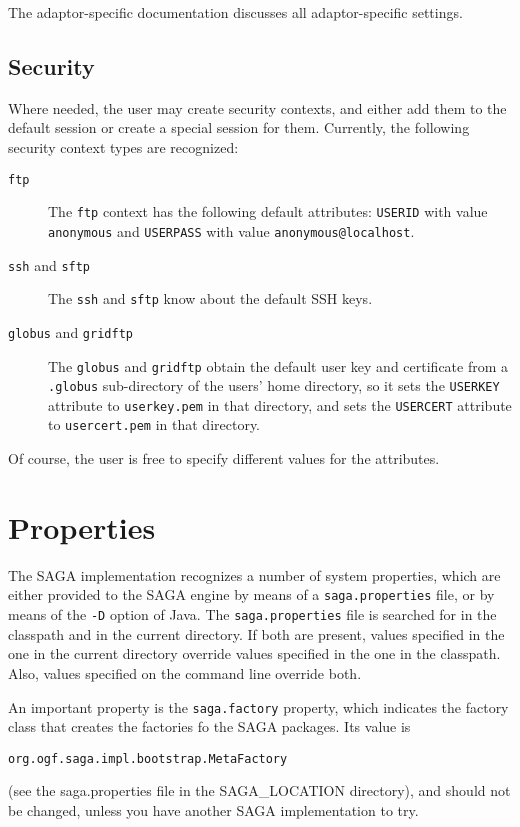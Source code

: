 \documentclass[a4paper,10pt]{article}
\begin{document}
The adaptor-specific documentation discusses all adaptor-specific
settings.

\subsection{Security}

Where needed, the user may create security contexts, and either add them
to the default session or create a special session for them.
Currently, the following security context types are recognized:

\begin{description}

\item[\texttt{ftp}]
The \texttt{ftp} context has the following default attributes:
\texttt{USERID} with value \texttt{anonymous} and \texttt{USERPASS} with
value \texttt{anonymous@localhost}.

\item[\texttt{ssh} and \texttt{sftp}]
The \texttt{ssh} and \texttt{sftp} know about the default SSH keys.

\item[\texttt{globus} and \texttt{gridftp}]
The \texttt{globus} and \texttt{gridftp} obtain the default user key
and certificate from a \texttt{.globus} sub-directory of the users' home
directory, so it sets the \texttt{USERKEY} attribute to \texttt{userkey.pem}
in that directory, and sets the \texttt{USERCERT} attribute to
\texttt{usercert.pem} in that directory.

\end{description}

Of course, the user is free to specify different values for the attributes.

\section{Properties}

The SAGA implementation recognizes a number of system properties, which
are either provided to the SAGA engine by means of a \texttt{saga.properties}
file, or by means of the \texttt{-D} option of Java.
The \texttt{saga.properties} file is searched for in the classpath and in
the current directory. If both are present, values specified in the one
in the current directory override values specified in the one in the
classpath. Also, values specified on the command line override both.

An important property is the \texttt{saga.factory} property, which
indicates the factory class that creates the factories fo the SAGA
packages.
Its value is
\noindent
{\small
\begin{verbatim}
org.ogf.saga.impl.bootstrap.MetaFactory
\end{verbatim}
}
\noindent
(see the saga.properties file in the SAGA\_LOCATION directory), and
should not be changed, unless you have another SAGA implementation to try.
\end{document}
